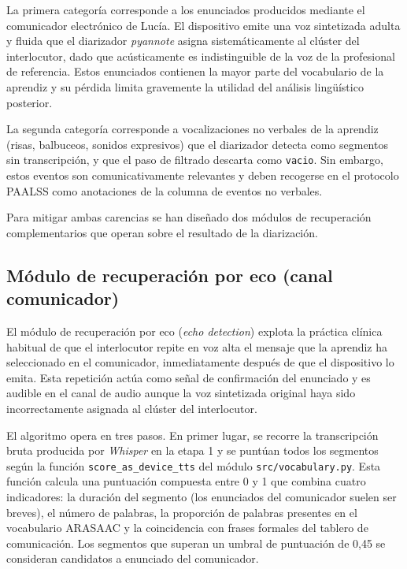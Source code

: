 La primera categoría corresponde a los enunciados producidos mediante el comunicador
electrónico de Lucía. El dispositivo emite una voz sintetizada adulta y fluida que el
diarizador \emph{pyannote} asigna sistemáticamente al clúster del interlocutor, dado
que acústicamente es indistinguible de la voz de la profesional de referencia. Estos
enunciados contienen la mayor parte del vocabulario de la aprendiz y su pérdida limita
gravemente la utilidad del análisis lingüístico posterior.

La segunda categoría corresponde a vocalizaciones no verbales de la aprendiz (risas,
balbuceos, sonidos expresivos) que el diarizador detecta como segmentos sin
transcripción, y que el paso de filtrado descarta como \texttt{vacio}. Sin embargo,
estos eventos son comunicativamente relevantes y deben recogerse en el protocolo
\ac{PAALSS} como anotaciones de la columna de eventos no verbales.

Para mitigar ambas carencias se han diseñado dos módulos de recuperación complementarios
que operan sobre el resultado de la diarización.


\subsection{Módulo de recuperación por eco (canal comunicador)}
\label{subsec:rec_eco}

El módulo de recuperación por eco (\emph{echo detection}) explota la práctica clínica
habitual de que el interlocutor repite en voz alta el mensaje que la aprendiz ha
seleccionado en el comunicador, inmediatamente después de que el dispositivo lo emita.
Esta repetición actúa como señal de confirmación del enunciado y es audible en el
canal de audio aunque la voz sintetizada original haya sido incorrectamente asignada al
clúster del interlocutor.

El algoritmo opera en tres pasos. En primer lugar, se recorre la transcripción bruta
producida por \emph{Whisper} en la etapa 1 y se puntúan todos los segmentos según la
función \texttt{score\_as\_device\_tts} del módulo \texttt{src/vocabulary.py}. Esta
función calcula una puntuación compuesta entre 0 y 1 que combina cuatro indicadores:
la duración del segmento (los enunciados del comunicador suelen ser breves), el número
de palabras, la proporción de palabras presentes en el vocabulario \ac{ARASAAC} y la
coincidencia con frases formales del tablero de comunicación. Los segmentos que superan
un umbral de puntuación de 0{,}45 se consideran candidatos a enunciado del comunicador.

